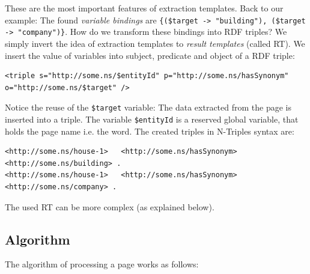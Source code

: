 These are the most important features of extraction templates.\newline
Back to our example:
The found \textit{variable bindings} are \texttt{\{(\$target -> "building"), (\$target -> "company")\}}. 
How do we transform these bindings into RDF triples? We simply invert the idea of extraction templates to \textit{result templates} (called RT). We insert the value of variables into subject, predicate and object of a RDF triple:
\begin{lstlisting}[style=XML]
<triple s="http://some.ns/$entityId" p="http://some.ns/hasSynonym" o="http://some.ns/$target" />
\end{lstlisting}
Notice the reuse of the \texttt{\$target} variable:
The data extracted from the page is inserted into a triple.
The variable \texttt{\$entityId} is a reserved global variable, that holds the page name i.e. the word.
The created triples in N-Triples syntax are:
\begin{lstlisting}[style=N3]
<http://some.ns/house-1>   <http://some.ns/hasSynonym>   <http://some.ns/building> .
<http://some.ns/house-1>   <http://some.ns/hasSynonym>   <http://some.ns/company> .
\end{lstlisting}
The used RT can be more complex (as explained below).

\subsection{Algorithm}
The algorithm of processing a page works as follows:

